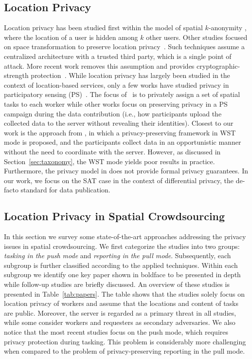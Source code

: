 \documentclass{USC-Thesis}
\numberwithin{equation}{chapter}
\begin{document}
\subsection{Location Privacy}
Location privacy has been studied first within the model of spatial $k$-anonymity \cite{gruteser2003anonymous,kido2005anonymous,mca06,gedik2008protecting,xue2009location,dewri2010query,palanisamy2011mobimix}, where the location of a user is hidden among $k$ other users. Other studies focused on space transformation to preserve location privacy~\cite{khoshgozaran2007blind,yiu2008spacetwist}.
Such techniques assume a centralized architecture with a trusted third party, which is a single point of attack. More recent work removes this assumption and provides cryptographic-strength protection~\cite{ghinita2008private}. While location privacy has largely been studied in the context of location-based services, only a few works have studied privacy in participatory sensing (PS)~\cite{kazemi2011towards,hu2010privacy,huang2009towards,cornelius2008anonysense}. The focus of~\cite{kazemi2011towards} is to privately assign a set of spatial tasks to each worker while other works \cite{hu2010privacy,huang2009towards} focus on preserving privacy in a PS campaign during the data contribution (i.e., how participants upload the collected data to the server without revealing their identities). Closest to our work is the approach from \cite{cornelius2008anonysense}, in which a privacy-preserving framework in WST mode is proposed, and the participants collect data in an opportunistic manner without the need to coordinate with the server. However, as discussed in Section~\ref{sec:taxonomy}, the WST mode yields poor results in practice. Furthermore, the privacy model in \cite{cornelius2008anonysense} does not provide formal privacy guarantees. In our work, we focus on the SAT case in the context of differential privacy, the de-facto standard for data publication.

\subsection{Location Privacy in Spatial Crowdsourcing}

In this section we survey some state-of-the-art approaches addressing the privacy issues in spatial crowdsourcing. We first categorize the studies into two groups: \emph{tasking in the push mode} and \emph{reporting in the pull mode}. Subsequently, each subgroup is further classified according to the applied techniques. Within each subgroup we identify one key paper shown in boldface to be presented in depth while follow-up studies are briefly discussed. An overview of these studies is presented in Table~\ref{tab:papers}. The table shows that the studies solely focus on location privacy of workers and assume that the locations and content of tasks are public. Moreover, the server is regarded as a primary threat in all studies, while some consider workers and requesters as secondary adversaries. We also notice that the most recent studies focus on the push mode, which requires privacy protection during tasking. This problem is considerably more challenging when compared to the problem of privacy-preserving reporting in the pull mode.
\end{document}
